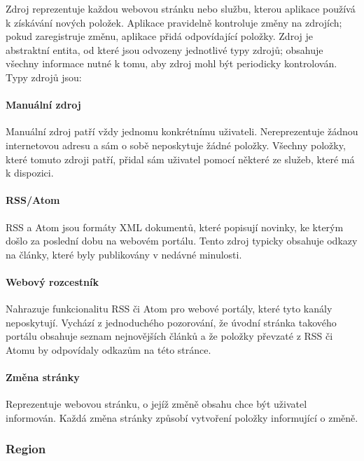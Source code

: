 Zdroj reprezentuje každou webovou stránku nebo službu, kterou aplikace používá k získávání nových položek.
Aplikace pravidelně kontroluje změny na zdrojích; pokud zaregistruje změnu, aplikace přidá odpovídající položky.
Zdroj je abstraktní entita, od které jsou odvozeny jednotlivé typy zdrojů; obsahuje všechny informace nutné k tomu, aby zdroj mohl být periodicky kontrolován.
Typy zdrojů jsou:

\paragraph{Manuální zdroj}

Manuální zdroj patří vždy jednomu konkrétnímu uživateli.
Nereprezentuje žádnou internetovou adresu a sám o sobě neposkytuje žádné položky.
Všechny položky, které tomuto zdroji patří, přidal sám uživatel pomocí některé ze služeb, které má k dispozici.

\paragraph{RSS/Atom}

RSS a Atom jsou formáty XML dokumentů, které popisují novinky, ke kterým došlo za poslední dobu na webovém portálu.
Tento zdroj typicky obsahuje odkazy na články, které byly publikovány v nedávné minulosti.

\paragraph{Webový rozcestník}

Nahrazuje funkcionalitu RSS či Atom pro webové portály, které tyto kanály neposkytují.
Vychází z jednoduchého pozorování, že úvodní stránka takového portálu obsahuje seznam nejnovějších článků a že položky převzaté z RSS či Atomu by odpovídaly odkazům na této stránce.

\paragraph{Změna stránky}

Reprezentuje webovou stránku, o jejíž změně obsahu chce být uživatel informován.
Každá změna stránky způsobí vytvoření položky informující o změně.

\subsubsection{Region}

